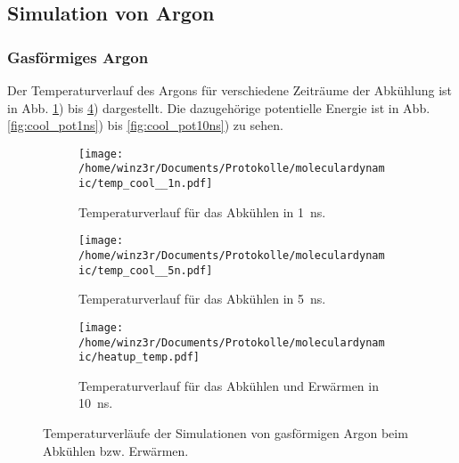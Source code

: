 \subsection{Simulation von Argon}
\subsubsection{Gasförmiges Argon}
Der Temperaturverlauf des Argons für verschiedene Zeiträume der Abkühlung ist in Abb. \ref{fig:cool_temp1ns}) bis \ref{fig:cool_temp10ns}) dargestellt.
Die dazugehörige potentielle Energie ist in Abb. \ref{fig:cool_pot1ns}) bis \ref{fig:cool_pot10ns}) zu sehen.
\begin{figure}
  \centering
  \vspace{-0.3cm}
  \begin{subfigure}[h]{0.45\textwidth}
    \centering
    \texttt{[image: /home/winz3r/Documents/Protokolle/moleculardynamic/temp\_cool\_\_1n.pdf]}
    \caption{\centering Temperaturverlauf für das Abkühlen in 1~ns.}\label{fig:cool_temp1ns}
  \end{subfigure}
  \vspace{0.25cm}
  \centering
  \begin{subfigure}[h]{0.45\textwidth}
    \centering
    \texttt{[image: /home/winz3r/Documents/Protokolle/moleculardynamic/temp\_cool\_\_5n.pdf]}
    \caption{\centering Temperaturverlauf für das Abkühlen in 5~ns.}\label{fig:cool_temp5ns}
  \end{subfigure}
  \vspace{0.25cm}
  \centering
  \begin{subfigure}{\textwidth}
    \centering
    \texttt{[image: /home/winz3r/Documents/Protokolle/moleculardynamic/heatup\_temp.pdf]}
    \caption{Temperaturverlauf für das Abkühlen und Erwärmen in 10~ns.}\label{fig:cool_temp10ns}
  \end{subfigure}
  \caption{Temperaturverläufe der Simulationen von gasförmigen Argon beim Abkühlen bzw. Erwärmen.}
\end{figure}
